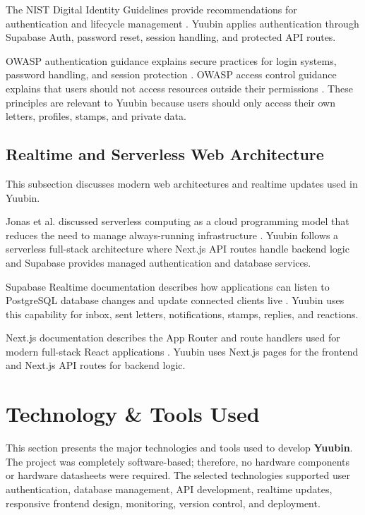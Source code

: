 ﻿\documentclass[12pt,a4paper]{report}
\begin{document}
The NIST Digital Identity Guidelines provide recommendations for authentication and lifecycle management \cite{nist_auth}. Yuubin applies authentication through Supabase Auth, password reset, session handling, and protected API routes.

OWASP authentication guidance explains secure practices for login systems, password handling, and session protection \cite{owasp_authentication}. OWASP access control guidance explains that users should not access resources outside their permissions \cite{owasp_access_control}. These principles are relevant to Yuubin because users should only access their own letters, profiles, stamps, and private data.

\subsection{Realtime and Serverless Web Architecture}
This subsection discusses modern web architectures and realtime updates used in Yuubin.

Jonas et al. discussed serverless computing as a cloud programming model that reduces the need to manage always-running infrastructure \cite{jonas2019serverless}. Yuubin follows a serverless full-stack architecture where Next.js API routes handle backend logic and Supabase provides managed authentication and database services.

Supabase Realtime documentation describes how applications can listen to PostgreSQL database changes and update connected clients live \cite{supabase_realtime}. Yuubin uses this capability for inbox, sent letters, notifications, stamps, replies, and reactions.

Next.js documentation describes the App Router and route handlers used for modern full-stack React applications \cite{nextjs_docs}. Yuubin uses Next.js pages for the frontend and Next.js API routes for backend logic.

\section{Technology \& Tools Used}

This section presents the major technologies and tools used to develop \textbf{Yuubin}. The project was completely software-based; therefore, no hardware components or hardware datasheets were required. The selected technologies supported user authentication, database management, API development, realtime updates, responsive frontend design, monitoring, version control, and deployment.
\end{document}
